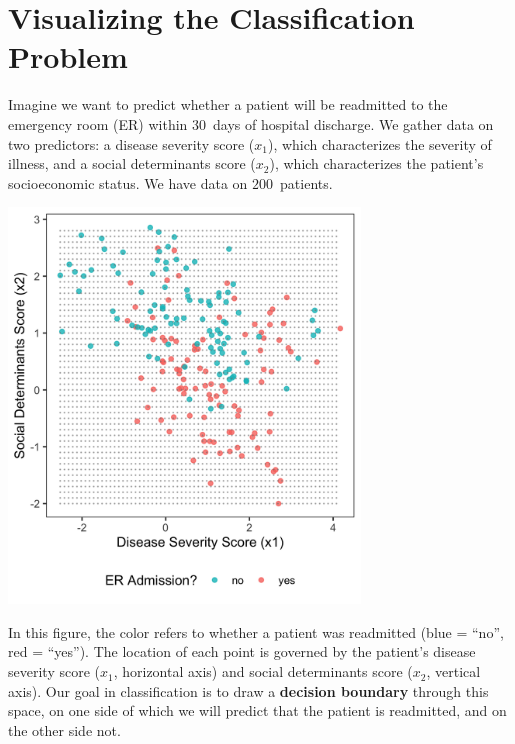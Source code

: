 
\section{Visualizing the Classification Problem \label{section:visualizingclass}}

Imagine we want to predict whether a patient will be readmitted to the emergency room (ER) within $30$~days of hospital discharge. We gather data on two predictors: a disease severity score ($x_1$), which characterizes the severity of illness, and a social determinants score ($x_2$), which characterizes the patient's socioeconomic status. We have data on $200$~patients.

\begin{center}
\includegraphics[width=0.7\textwidth]{img/esl-just-data.png}
\end{center}

In this figure, the color refers to whether a patient was readmitted (blue = ``no'', red = ``yes''). The location of each point is governed by the patient's disease severity score ($x_1$, horizontal axis) and social determinants score ($x_2$, vertical axis). Our goal in classification is to draw a \textbf{decision boundary} through this space, on one side of which we will predict that the patient is readmitted, and on the other side not.


